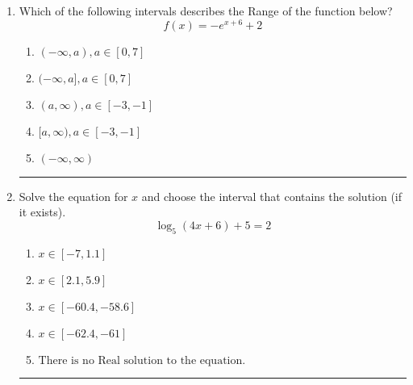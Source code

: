 \documentclass[14pt]{extbook}
\newcommand{\litem}[1]{\item#1\hspace*{-1cm}\rule{\textwidth}{0.4pt}}
\begin{document}
\begin{enumerate}
{\begin{enumerate}[label=\Alph*.]
\end{enumerate} }
\litem{
Which of the following intervals describes the Range of the function below?\[ f(x) = -e^{x+6}+2 \]\begin{enumerate}[label=\Alph*.]
\item \( (-\infty, a), a \in [0, 7] \)
\item \( (-\infty, a], a \in [0, 7] \)
\item \( (a, \infty), a \in [-3, -1] \)
\item \( [a, \infty), a \in [-3, -1] \)
\item \( (-\infty, \infty) \)

\end{enumerate} }
\litem{
Solve the equation for $x$ and choose the interval that contains the solution (if it exists).\[ \log_{5}{(4x+6)}+5 = 2 \]\begin{enumerate}[label=\Alph*.]
\item \( x \in [-7, 1.1] \)
\item \( x \in [2.1, 5.9] \)
\item \( x \in [-60.4, -58.6] \)
\item \( x \in [-62.4, -61] \)
\item \( \text{There is no Real solution to the equation.} \)

\end{enumerate} }
\end{enumerate}
\end{document}
